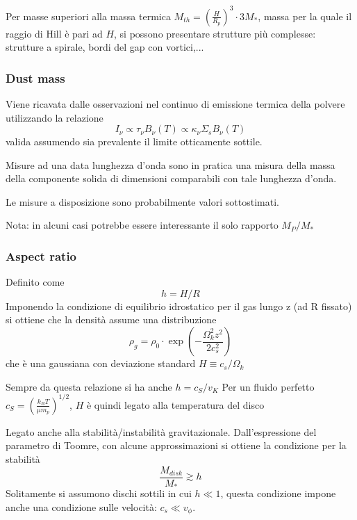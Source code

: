 \documentclass[DIN, pagenumber=false, fontsize=11pt, parskip=half]{scrartcl}
\begin{document}
Per masse superiori alla massa termica $M_{th} = \left(\frac {H}{ R_p} \right)^3\cdot 3M_*$, massa per la quale il raggio di Hill è pari ad $H$, si possono presentare strutture più complesse: strutture a spirale, bordi del gap con vortici,...

\subsubsection{Dust mass}
\label{dustmass}
Viene ricavata dalle osservazioni nel continuo di emissione termica della polvere utilizzando la relazione
\begin{equation}
 I_\nu \propto \tau_\nu B_\nu(T) \propto \kappa_\nu \Sigma_s B_\nu(T)
\end{equation}
valida assumendo sia prevalente il limite otticamente sottile.

Misure ad una data lunghezza d'onda sono in pratica una misura della massa della componente solida di dimensioni comparabili con tale lunghezza d'onda.

Le misure a disposizione sono probabilmente valori sottostimati.

Nota: in alcuni casi potrebbe essere interessante il solo rapporto $M_P/M_*$ 
\subsubsection{Aspect ratio}
\label{aspectratio}
Definito come
\begin{equation}
h =H/R
\end{equation}
Imponendo la condizione di equilibrio idrostatico per il gas lungo z (ad R fissato) si ottiene che la densità assume una distribuzione
\begin{equation}
\rho_g = \rho_0 \cdot \exp(-\frac{\Omega_k^2z^2}{2c_s^2})
\end{equation}
che è una gaussiana con deviazione standard $H \equiv c_s/\Omega_k$

Sempre da questa relazione si ha anche $h = c_S/v_K$
Per un fluido perfetto $c_S=(\frac{k_BT}{\mu m_p})^{1/2}$, $H$ è quindi legato alla temperatura del disco

Legato anche alla stabilità/instabilità gravitazionale. Dall'espressione del parametro di Toomre, con alcune approssimazioni si ottiene la condizione per la stabilità
\begin{equation}
\frac{M_{disk}}{M_*} \gtrsim h
\end{equation}
Solitamente si assumono dischi sottili in cui $h \ll 1$, questa condizione impone anche una condizione sulle velocità: $c_s \ll v_\phi$.
\end{document}
